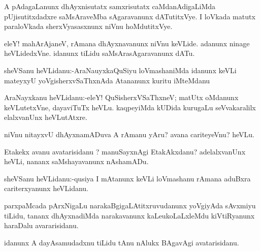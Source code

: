 \documentclass{article}
\begin{document}
\begin{mn}%
A pAdagaLanunx dhAyxnisutatx samxrisutatx caMdanAdigaLiMda pUjisutitxdadxre saMsAraveMba 
sAgaravanunx dATutitxVye. I loVkada matutx paraloVkada sherxVyasasxnunx niVnu hoMdutitxVye.
\end{mn}

\begin{mn}%
eleY! mahArAjaneV, rAmana dhAyxnavanunx niVnu keVLide. adanunx ninage heVLidedxVne. idanunx 
tiLidu saMsArasAgaravanunx dATu.
\end{mn}



\begin{mn}%
sheVSanu heVLidanu:-AraNauyxkaQuSiyu loVmashaniMda idanunx keVLi mateyxyU 
yoVgisherxvSaThxnAda Atananunx kuritu iMteMdanu
\end{mn}

\begin{mn}%
AraNayxkanu heVLidanu:-eleY! QuSisherxVSaThxneV; matUtx oMdanunx keVLutetxVne, dayaviTuTx 
heVLu. kaqpeyiMda kUDida kurugaLu seVvakaralilx elalxvanUnx heVLutAtxre.
\end{mn}

\begin{mn}%
niVnu nitayxvU dhAyxnamADuva A rAmanu yAru? avana cariteyeVnu? heVLu.
\end{mn}

\begin{mn}%
Etakekx avanu avatarisidanu ? manuSayxnAgi EtakAkxdanu? adelalxvanUnx heVLi, nananx 
saMshayavanunx nAshamADu.
\end{mn}

\begin{mn}%
sheVSanu heVLidanu:-qusiya I mAtanunx keVLi loVmashanu rAmana aduBxra cariterxyanunx 
heVLidanu.
\end{mn}

\begin{mn}%
parxpaMcada pArxNigaLu narakaBgigaLAtitxruvudanunx yoVgiyAda sAvxmiyu tiLidu, tananx 
dhAyxnadiMda narakavanunx kaLeukoLaLxleMdu kiVtiRyanunx haraDalu avararisidanu.
\end{mn}

\begin{mn}%
idanunx A dayAsamudadxnu tiLidu tAnu nAlukx BAgavAgi avatarisidanu.
\end{mn}
\end{document}
